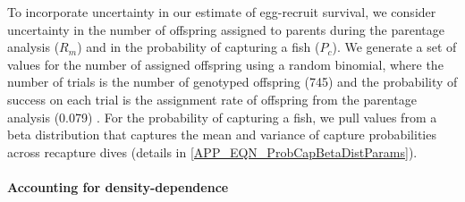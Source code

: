 \documentclass[12pt, oneside]{article}   	%
\begin{document}

To incorporate uncertainty in our estimate of egg-recruit survival, we consider uncertainty in the number of offspring assigned to parents during the parentage analysis ($R_m$) and in the probability of capturing a fish ($P_c$). We generate a set of values for the number of assigned offspring using a random binomial, where the number of trials is the number of genotyped offspring (745) and the probability of success on each trial is the assignment rate of offspring from the parentage analysis (0.079) \citep{catalanoInPrepconnectivity}. For the probability of capturing a fish, we pull values from a beta distribution that captures the mean and variance of capture probabilities across recapture dives (details in \ref{APP_EQN_ProbCapBetaDistParams}).


\paragraph*{Accounting for density-dependence}  %
\end{document}
